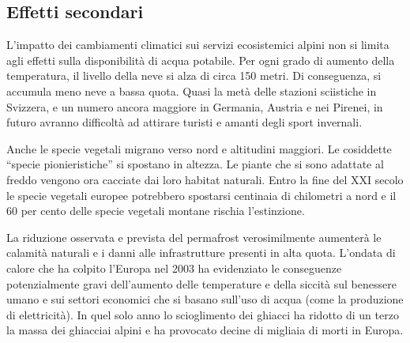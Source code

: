 \documentclass[12pt,a4paper]{article}
\begin{document}
	
	\subsection{Effetti secondari}
		L'impatto dei cambiamenti climatici sui servizi ecosistemici alpini non si limita agli effetti sulla disponibilità di acqua potabile. Per ogni grado di aumento della temperatura, il livello della neve si alza di circa 150 metri. Di conseguenza, si accumula meno neve a bassa quota. Quasi la metà delle stazioni sciistiche in Svizzera, e un numero ancora maggiore in Germania, Austria e nei Pirenei, in futuro avranno difficoltà ad attirare turisti e amanti degli sport invernali.
		
		Anche le specie vegetali migrano verso nord e altitudini maggiori. Le cosiddette ``specie pionieristiche'' si spostano in altezza. Le piante che si sono adattate al freddo vengono ora cacciate dai loro habitat naturali. Entro la fine del XXI secolo le specie vegetali europee potrebbero spostarsi centinaia di chilometri a nord e il 60 per cento delle specie vegetali montane rischia l'estinzione.
		
		La riduzione osservata e prevista del permafrost verosimilmente aumenterà le calamità naturali e i danni alle infrastrutture presenti in alta quota. L'ondata di calore che ha colpito l'Europa nel 2003 ha evidenziato le conseguenze potenzialmente gravi dell'aumento delle temperature e della siccità sul benessere umano e sui settori economici che si basano sull'uso di acqua (come la produzione di elettricità). In quel solo anno lo scioglimento dei ghiacci ha ridotto di un terzo la massa dei ghiacciai alpini e ha provocato decine di migliaia di morti in Europa.
	
	\newpage
	
\end{document}
